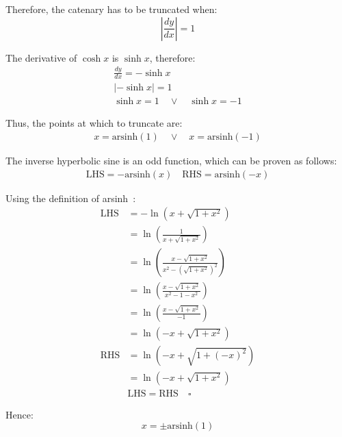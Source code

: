 \documentclass[12pt]{article}
\begin{document}
        Therefore, the catenary has to be truncated when:
        \begin{equation}
            | \frac{dy}{dx} | = 1
        \end{equation}

        The derivative of $\cosh x$ is $\sinh x$, therefore:
        \begin{align}
            \frac{dy}{dx} = - \sinh x \\
            | - \sinh x | = 1 \\
            \sinh x = 1 \quad\lor\quad \sinh x = -1
        \end{align}

        Thus, the points at which to truncate are:
        \begin{align}\label{eq:x_cosh_end}
            x = \text{arsinh}(1) \quad\lor\quad x = \text{arsinh}(-1)
        \end{align}

        The inverse hyperbolic sine is an odd function, which can be proven as follows:
        \begin{align}
            \text{LHS} = -\text{arsinh}(x) \quad \text{RHS} = \text{arsinh}(-x)
        \end{align}

        Using the definition of arsinh~\cite{oxford_dict}:
        \begin{align}
            \text{LHS} &= - \ln(x+\sqrt{1+x^2}) \\
            &= \ln(\frac{1}{x+\sqrt{1+x^2}}) \\
            &= \ln(\frac{x-\sqrt{1+x^2}}{x^2-(\sqrt{1+x^2})^2}) \\
            &= \ln(\frac{x-\sqrt{1+x^2}}{x^2-1-x^2}) \\
            &= \ln(\frac{x-\sqrt{1+x^2}}{-1}) \\ 
            &= \ln(-x+\sqrt{1+x^2}) \\ 
            \text{RHS} &= \ln(-x+\sqrt{1+(-x)^2}) \\
            &= \ln(-x+\sqrt{1+x^2}) \\
            &\text{LHS} = \text{RHS} \quad \square
        \end{align}

        Hence:
        \begin{equation}
            x = \pm \text{arsinh}(1)
        \end{equation} 
\end{document}
